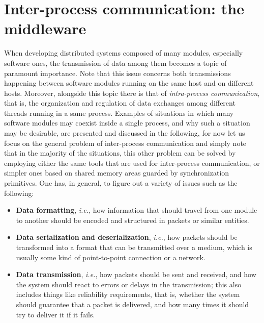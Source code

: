\section{Inter-process communication: the middleware}
\label{sec:middleware}
When developing distributed systems composed of many modules, especially software ones, the transmission of data among them becomes a topic of paramount importance. Note that this issue concerns both transmissions happening between software modules running on the same host and on different hosts. Moreover, alongside this topic there is that of \emph{intra-process communication}, that is, the organization and regulation of data exchanges among different threads running in a same process. Examples of situations in which many software modules may coexist inside a single process, and why such a situation may be desirable, are presented and discussed in the following, for now let us focus on the general problem of inter-process communication and simply note that in the majority of the situations, this other problem can be solved by employing either the same tools that are used for inter-process communication, or simpler ones based on shared memory areas guarded by synchronization primitives.
One has, in general, to figure out a variety of issues such as the following:
\begin{itemize}
  \item \textbf{Data formatting}, \emph{i.e.}, how information that should travel from one module to another should be encoded and structured in packets or similar entities.
  \item \textbf{Data serialization and deserialization}, \emph{i.e.}, how packets should be transformed into a format that can be transmitted over a medium, which is usually some kind of point-to-point connection or a network.
  \item \textbf{Data transmission}, \emph{i.e.}, how packets should be sent and received, and how the system should react to errors or delays in the transmission; this also includes things like reliability requirements, that is, whether the system should guarantee that a packet is delivered, and how many times it should try to deliver it if it fails.
\end{itemize}
